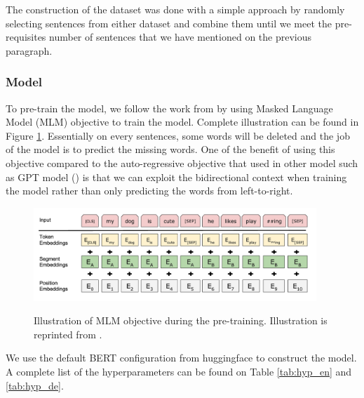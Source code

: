 The construction of the dataset was done with a simple approach by randomly selecting sentences from either dataset and combine them until we meet the pre-requisites number of sentences that we have mentioned on the previous paragraph.

\subsubsection{Model}
To pre-train the model, we follow the work from \cite{devlin2018bert} by using Masked Language Model (MLM) objective to train the model. Complete illustration can be found in Figure \ref{img:mlmobj}. Essentially on every sentences, some words will be deleted and the job of the model is to predict the missing words. One of the benefit of using this objective compared to the auto-regressive objective that used in other model such as GPT model (\cite{brown2020language,ratford2019language,radford2018improving}) is that we can exploit the bidirectional context when training the model rather than only predicting the words from left-to-right.

\begin{figure}[h]
    {\includegraphics[width=0.95\textwidth]{img/mlm_obj.png}}
    \centering
    \caption{Illustration of MLM objective during the pre-training. Illustration is reprinted from \cite{devlin2018bert}.}
    \label{img:mlmobj}
\end{figure}

We use the default BERT configuration from huggingface to construct the model. A complete list of the hyperparameters can be found on Table \ref{tab:hyp_en} and \ref{tab:hyp_de}.

